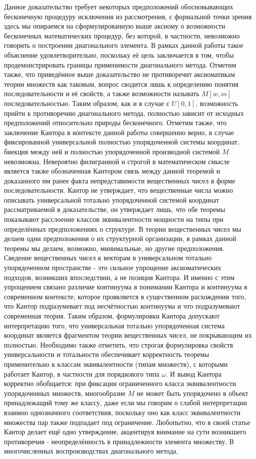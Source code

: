 \documentclass[12pt]{article}
\begin{document}
Данное доказательство требует некоторых предположений обосновывающих бесконечную процедуру исключения из рассмотрения, с формальной точки зрения здесь мы опираемся на сформулированную выше аксиому о возможности бесконечных математических процедур, без которой, в частности, невозможно говорить о построении диагонального элемента. В рамках данной работы такое объяснение удовлетворительно, поскольку её цель заключается в том, чтобы продемонстрировать границы применимости диагонального метода. Отметим также, что приведённое выше доказательство не противоречит аксиоматикам теории множеств как таковым, вопрос сводится лишь к определению понятия последовательности и её свойств, а также возможности называть $M[w, m]$ последовательностью. Таким образом, как и в случае с $U[0, 1]$, возможность прийти к противоречию диагонального метода, полностью зависит от исходных предположений относительно природы бесконечного. Отметим также, что заключение Кантора в контексте данной работы совершенно верно, в случае фиксированной универсальной полностью упорядоченной системы координат, биекция между ней и полностью упорядоченной производной системой $M$ невозможна. Невероятно филигранной и строгой в математическом смысле является также обозначенная Кантором связь между данной теоремой и доказанного им ранее факта непредставимости вещественных чисел в форме последовательности. Кантор не утверждает, что вещественные числа можно описывать универсальной тотально упорядоченной системой координат рассматриваемой в доказательстве, он утверждает лишь, что обе теоремы показывают расслоение классов эквивалентности мощности на типы при определённых предположениях о структуре. В теории вещественных чисел мы делаем одни предположения о их структурной организации, в рамках данной теоремы мы делаем, возможно, минимальные, но другие предположения. Сведение вещественных чисел к векторам в универсальном тотально упорядоченном пространстве - это сильное упрощение аксиоматических подходов, возникших впоследствии, а не позиция Кантора. И именно с этим упрощением связано различие континуума в понимании Кантора и континуума в современном контексте, которое проявляется в существенном расхождении того, что Кантор подразумевает под несчётностью континуума и что подразумевают современная теория. Таким образом, формулировки Кантора допускают интерпретацию того, что универсальная тотально упорядоченная система координат является фрагментом теории вещественных чисел, не покрывающим их полностью. Необходимо также отметить, что строгая формулировка свойств универсальности и тотальности обеспечивает корректность теоремы применительно к классам эквивалентности (типам множеств), с которыми работает Кантор, в частности для порядкового типа $\omega$. И вывод Кантора корректно обобщается: при фиксации ограниченного класса эквивалентности упорядоченных множеств, многообразие $M$ не может быть упорядочено в объект принадлежащий тому же классу, даже если мы говорим о слабой интерпретации взаимно однозначного соответствия, поскольку оно как класс эквивалентности множества пар также подпадает под ограничение. Любопытно, что в своей статье Кантор делает ещё одно утверждение, акцентируя внимание на сути возникшего противоречия - неопределённость в принадлежности элемента множеству. В многочисленных воспроизводствах диагонального метода, 
\end{document}
